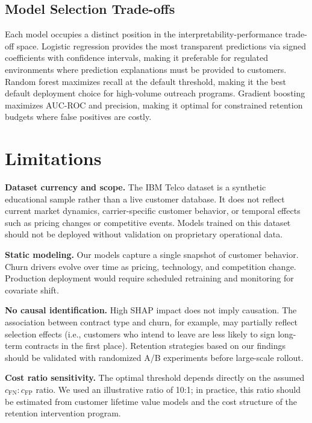 \documentclass{article}
\begin{document}
\subsection{Model Selection Trade-offs}

Each model occupies a distinct position in the interpretability-performance trade-off space.
Logistic regression provides the most transparent predictions via signed coefficients with
confidence intervals, making it preferable for regulated environments where prediction
explanations must be provided to customers. Random forest maximizes recall at the default
threshold, making it the best default deployment choice for high-volume outreach programs.
Gradient boosting maximizes AUC-ROC and precision, making it optimal for constrained
retention budgets where false positives are costly.


\section{Limitations}

\textbf{Dataset currency and scope.} The IBM Telco dataset is a synthetic educational
sample rather than a live customer database. It does not reflect current market
dynamics, carrier-specific customer behavior, or temporal effects such as pricing
changes or competitive events. Models trained on this dataset should not be deployed
without validation on proprietary operational data.

\textbf{Static modeling.} Our models capture a single snapshot of customer behavior.
Churn drivers evolve over time as pricing, technology, and competition change.
Production deployment would require scheduled retraining and monitoring for
covariate shift.

\textbf{No causal identification.} High SHAP impact does not imply causation.
The association between contract type and churn, for example, may partially reflect
selection effects (i.e., customers who intend to leave are less likely to sign
long-term contracts in the first place). Retention strategies based on our findings
should be validated with randomized A/B experiments before large-scale rollout.

\textbf{Cost ratio sensitivity.} The optimal threshold depends directly on the
assumed $c_{\text{FN}}:c_{\text{FP}}$ ratio. We used an illustrative ratio of 10:1;
in practice, this ratio should be estimated from customer lifetime value models
and the cost structure of the retention intervention program.
\end{document}
